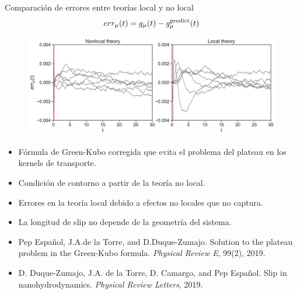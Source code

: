 \documentclass{beamer}
\begin{document}
\begin{frame}{Comparación de errores entre teorías local y no local}
  \begin{align}
  err_\mu(t)=  g_\mu(t)-g^{\rm predict}_\mu(t)
    \nonumber
  \end{align}
    \begin{figure}
\includegraphics[width=\linewidth]{errors-17nodes-WALLS-defense}
\end{figure}
\end{frame}

\begin{frame}
  \begin{itemize}
    \item<1-> Fórmula de Green-Kubo corregida que evita el \alert{problema del plateau} en los kernels de transporte. 
    \item<2-> \alert{Condición de contorno} a partir de la teoría no local. 
    \item<3-> Errores en la teoría local debido a \alert{efectos no locales} que no captura.  
    \item<4-> La \alert{longitud de slip} no depende de la geometría del sistema. 
    \item<5-> Pep Espa\~nol, J.A.de la Torre, and D.Duque-Zumajo. Solution to the plateau problem in the Green-Kubo formula. \textit{Physical Review E}, 99(2), 2019.
    \item<5-> D. Duque-Zumajo, J.A. de la Torre, D. Camargo, and Pep Español. Slip in nanohydrodynamics. \textit{Physical Review Letters}, 2019. 
  \end{itemize}

\end{frame}
\end{document}
